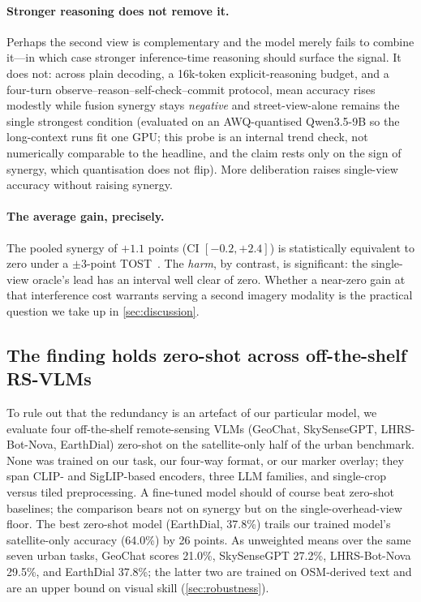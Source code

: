 \paragraph{Stronger reasoning does not remove it.}
Perhaps the second view is complementary and the model merely fails to combine
it---in which case stronger inference-time reasoning should surface the signal. It
does not: across plain decoding, a \num{16}k-token
explicit-reasoning budget, and a four-turn observe--reason--self-check--commit
protocol, mean accuracy rises modestly while fusion synergy stays \emph{negative} and
street-view-alone remains the single strongest condition (evaluated on an
AWQ-quantised Qwen3.5-9B so the long-context runs fit one GPU; this probe is an
internal trend check, not numerically comparable to the headline, and the claim rests
only on the sign of synergy, which quantisation does not flip). More deliberation
raises single-view accuracy without raising synergy.

\paragraph{The average gain, precisely.}
The pooled synergy of $+\num{1.1}$ points (CI $[-\num{0.2},+\num{2.4}]$) is
statistically equivalent to zero under a $\pm\num{3}$-point
TOST~\cite{lakens2018tost}. The \emph{harm}, by contrast, is significant: the
single-view oracle's lead has an interval well clear of zero. Whether a near-zero
gain at that interference cost warrants serving a second imagery modality is the
practical question we take up in \cref{sec:discussion}.

\subsection{The finding holds zero-shot across off-the-shelf RS-VLMs}
\label{sec:zeroshot}

To rule out that the redundancy is an artefact of our particular model, we evaluate
four off-the-shelf remote-sensing VLMs (GeoChat, SkySenseGPT, LHRS-Bot-Nova,
EarthDial) zero-shot on the satellite-only half of the urban benchmark. None was
trained on our task, our four-way format, or our marker overlay; they span CLIP- and
SigLIP-based encoders, three LLM families, and single-crop versus tiled
preprocessing. A fine-tuned model
should of course beat zero-shot baselines; the comparison bears not on synergy but on
the single-overhead-view floor. The best zero-shot model (EarthDial, \num{37.8}\%) trails our trained model's
satellite-only accuracy (\num{64.0}\%) by \num{26} points. As unweighted means over
the same seven urban tasks, GeoChat scores \num{21.0}\%, SkySenseGPT \num{27.2}\%,
LHRS-Bot-Nova \num{29.5}\%, and EarthDial \num{37.8}\%; the latter two are trained on
OSM-derived text and are an upper bound on visual skill (\cref{sec:robustness}).

